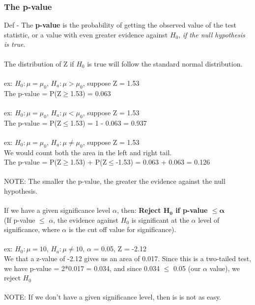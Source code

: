 \documentclass[12pt, a4paper]{article}
\begin{document}
		\subsubsection{The p-value}
		Def - The \textbf{p-value} is the probability of getting the observed value of the test statistic, or a value with even greater evidence against $H_0$, \textit{if the null hypothesis is true}. \\~\\
		The distribution of Z if $H_0$ is true will follow the standard normal distribution. \\~\\
		ex: $H_0 : \mu = \mu_0$, $H_a: \mu > \mu_0$, suppose Z = 1.53 \\
		The p-value = P(Z$\geq$1.53) = 0.063 \\~\\
		ex: $H_0 : \mu = \mu_0$, $H_a: \mu < \mu_0$, suppose Z = 1.53 \\
		The p-value = P(Z$\leq$1.53) = 1 - 0.063 = 0.937 \\~\\
		ex: $H_0 : \mu = \mu_0$, $H_a: \mu \neq \mu_0$, suppose Z = 1.53 \\
		We would count both the area in the left and right tail. \\ The p-value = P(Z$\geq$1.53) + P(Z$\leq$-1.53) = 0.063 + 0.063 = 0.126 \\~\\
		NOTE: The smaller the p-value, the greater the evidence against the null hypothesis. \\~\\
		If we have a given significance level $\alpha$, then: \textbf{Reject $\bm{H_0}$ if p-value $\bm{\leq \alpha}$} \\
		(If p-value $\leq$ $\alpha$, the evidence against $H_0$ is significant at the $\alpha$ level of significance, where $\alpha$ is the cut off value for significance). \\~\\
		ex: $H_0 : \mu = 10$, $H_a: \mu \neq 10$, $\alpha$ = 0.05, Z = -2.12 \\
		We that a z-value of -2.12 gives us an area of 0.017. Since this is a two-tailed test, we have p-value = 2*0.017 = 0.034, and since 0.034 $\leq$ 0.05 (our $\alpha$ value), we reject $H_0$ \\~\\
		NOTE: If we don't have a given significance level, then is is not as easy. \\~\\
\end{document}
